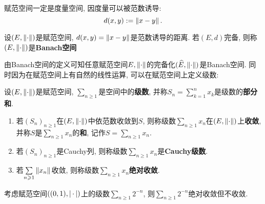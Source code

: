 	\begin{Remark}
	赋范空间一定是度量空间, 因度量可以被范数诱导:
	\[
	d(x,y):=\left\| x-y \right\|.
	\]
	\end{Remark}
	
	\begin{Definition}[Banach空间]\label{def:Banach空间}
	设$ (E,\left\| \cdot \right\|) $是赋范空间, $ d(x,y)=\left\| x-y \right\| $是范数诱导的距离. 若$ (E,d) $完备, 则称$ (E,\left\| \cdot \right\|) $是\textbf{Banach空间}
	\end{Definition}
	
	由Banach空间的定义可知任意赋范空间$ E,\left\| \cdot \right\| $的完备化$ (\widehat{E},\left\| \cdot \right\|) $是Banach空间. 同时因为在赋范空间上有自然的线性运算, 可以在赋范空间上定义级数:
	
	\begin{Definition}[级数]\label{def:级数}
	设$ (E,\left\| \cdot \right\|) $是赋范空间, $ \sum\limits_{n\geqslant 1} $是空间中的\textbf{级数}, 并称$ S_n=\sum\limits_{k=1}^nx_k $是级数的\textbf{部分和}.
	
	\begin{enumerate}[(1)]
	\item 若$ (S_n)_{n\geqslant 1} $在$ (E,\left\| \cdot \right\|) $中依范数收敛到$ S $, 则称级数$ \sum\limits_{n\geqslant 1}x_n $在$ (E,\left\| \cdot \right\|) $上\textbf{收敛}, 并称$ S $是$ \sum\limits_{n\geqslant 1}x_n $的\textbf{和}, 记作$ S=\sum\limits_{n\geqslant 1}x_n $.
	
	\item 若$ (S_n)_{n\geqslant 1} $是Cauchy列, 则称级数$ \sum\limits_{n\geqslant 1}x_n $是\textbf{Cauchy级数}.
	
	\item 若$ \sum\limits_{n\geqslant 1}\left\| x_n \right\| $收敛, 则称级数$ \sum\limits_{n\geqslant 1}x_n $\textbf{绝对收敛}.
	\end{enumerate}
	\end{Definition}
	
	\begin{Remark}
	考虑赋范空间$ ((0,1),\left| \,\cdot\, \right| ) $上的级数$ \sum\limits_{n\geqslant 1}2^{-n} $, 则$ \sum\limits_{n\geqslant 1}2^{-n} $绝对收敛但不收敛.
	\end{Remark}
	
